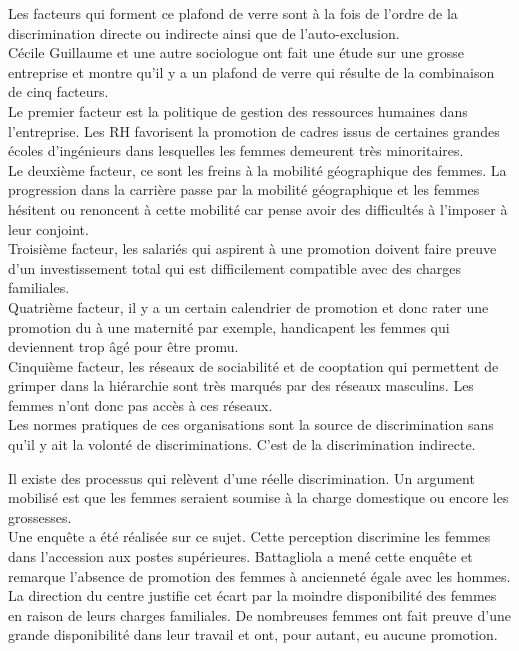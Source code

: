 \documentclass[12pt, a4paper, openany]{book}
\begin{document}
Les facteurs qui forment ce plafond de verre sont à la fois de l'ordre de la discrimination directe ou indirecte ainsi que de l'auto-exclusion. \\
Cécile Guillaume et une autre sociologue ont fait une étude sur une grosse entreprise et montre qu'il y a un plafond de verre qui résulte de la combinaison de cinq facteurs. \\
Le premier facteur est la politique de gestion des ressources humaines dans l'entreprise. Les RH favorisent la promotion de cadres issus de certaines grandes écoles d'ingénieurs dans lesquelles les femmes demeurent très minoritaires. \\
Le deuxième facteur, ce sont les freins à la mobilité géographique des femmes. La progression dans la carrière passe par la mobilité géographique et les femmes hésitent ou renoncent à cette mobilité car pense avoir des difficultés à l'imposer à leur conjoint. \\
Troisième facteur, les salariés qui aspirent à une promotion doivent faire preuve d'un investissement total qui est difficilement compatible avec des charges familiales. \\
Quatrième facteur, il y a un certain calendrier de promotion et donc rater une promotion du à une maternité par exemple, handicapent les femmes qui deviennent trop âgé pour être promu. \\
Cinquième facteur, les réseaux de sociabilité et de cooptation qui permettent de grimper dans la hiérarchie sont très marqués par des réseaux masculins. Les femmes n'ont donc pas accès à ces réseaux. \\
Les normes pratiques de ces organisations sont la source de discrimination sans qu'il y ait la volonté de discriminations. C'est de la discrimination indirecte. 


Il existe des processus qui relèvent d'une réelle discrimination. Un argument mobilisé est que les femmes seraient soumise à la charge domestique ou encore les grossesses. \\
Une enquête a été réalisée sur ce sujet. Cette perception discrimine les femmes dans l'accession aux postes supérieures. Battagliola a mené cette enquête et remarque l'absence de promotion des femmes à ancienneté égale avec les hommes. \\
La direction du centre justifie cet écart par la moindre disponibilité des femmes en raison de leurs charges familiales. De nombreuses femmes ont fait preuve d'une grande disponibilité dans leur travail et ont, pour autant, eu aucune promotion. 
\end{document}
